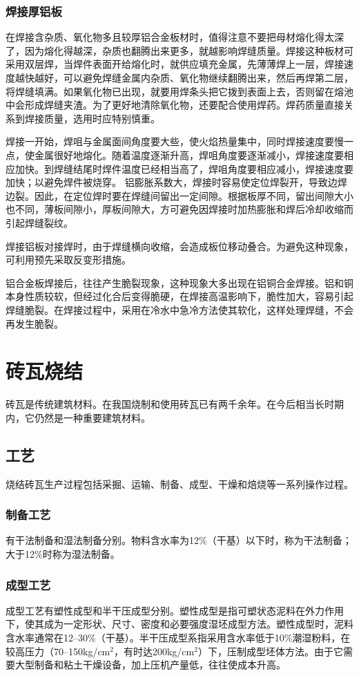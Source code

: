 \documentclass{ctexbook}
\begin{document}
\subsection{焊接厚铝板}
在焊接含杂质、氧化物多且较厚铝合金板材时，值得注意不要把母材熔化得太深了，因为熔化得越深，杂质也翻腾出来更多，就越影响焊缝质量。焊接这种板材可采用双层焊，当焊件表面开给熔化时，就供应填充金属，先薄薄焊上一层，焊接速度越快越好，可以避免焊缝金属内杂质、氧化物继续翻腾出来，然后再焊第二层，将焊缝填满。如果氧化物已出现，就要用焊条头把它拨到表面上去，否则留在熔池中会形成焊缝夹渣。为了更好地清除氧化物，还要配合使用焊药。焊药质量直接关系到焊接质量，选用时应特别慎重。

焊接一开始，焊咀与金属面间角度要大些，使火焰热量集中，同时焊接速度要慢一点，使金属很好地熔化。随着温度逐渐升高，焊咀角度要逐渐减小，焊接速度要相应加快。到焊缝结尾时焊件温度已经相当高了，焊咀角度要相应减小，焊接速度要加快；以避免焊件被烧穿。
铝膨胀系数大，焊接时容易使定位焊裂开，导致边焊边裂。因此，在定位焊时要在焊缝间留出一定间隙。根据板厚不同，留出间隙大小也不同，薄板间隙小，厚板间隙大，方可避免因焊接时加热膨胀和焊后冷却收缩而引起焊缝裂纹。

焊接铝板对接焊时，由于焊缝横向收缩，会造成板位移动叠合。为避免这种现象，可利用预先采取反变形措施。

铝合金板焊接后，往往产生脆裂现象，这种现象大多出现在铝铜合金焊接。铝和铜本身性质较软，但经过化合后变得脆硬，在焊接高温影响下，脆性加大，容易引起焊缝脆裂。在焊接过程中，采用在冷水中急冷方法使其软化，这样处理焊缝，不会再发生脆裂。
\chapter{砖瓦烧结}
砖瓦是传统建筑材料。在我国烧制和使用砖瓦已有两千余年。在今后相当长时期内，它仍然是一种重要建筑材料。
\section{工艺}
烧结砖瓦生产过程包括采掘、运输、制备、成型、干燥和焙烧等一系列操作过程。
\subsection{制备工艺}
有干法制备和湿法制备分别。物料含水率为12\%（干基）以下时，称为干法制备；大于12\%时称为湿法制备。
\subsection{成型工艺}
成型工艺有塑性成型和半干压成型分别。塑性成型是指可塑状态泥料在外力作用下，使其成为一定形状、尺寸、密度和必要强度湿坯成型方法。塑性成型时，泥料含水率通常在12--30\%（干基）。半干压成型系指采用含水率低于10\%潮湿粉料，在较高压力（70--150kg/cm$^{2}$，有时达200kg/cm$^{2}$）下，压制成型坯体方法。由于它需要大型制备和粘土干燥设备，加上压机产量低，往往使成本升高。
\end{document}
